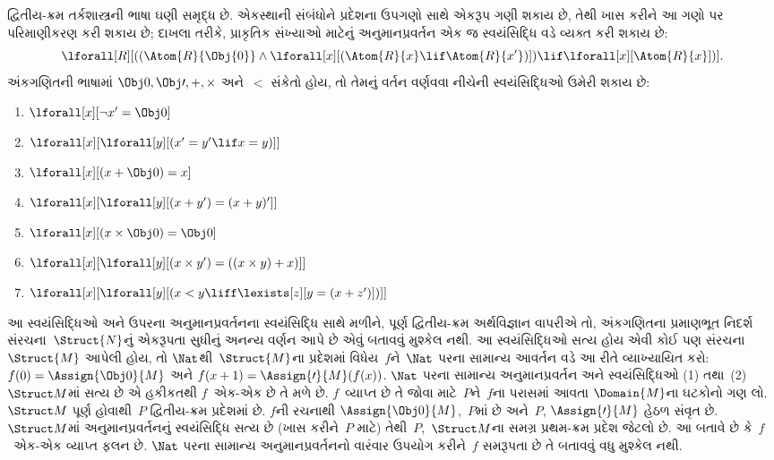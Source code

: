 દ્વિતીય-ક્રમ તર્કશાસ્ત્રની ભાષા ઘણી સમૃદ્ધ છે. એકસ્થાની સંબંધોને
પ્રદેશના ઉપગણો સાથે એકરૂપ ગણી શકાય છે, તેથી ખાસ કરીને આ ગણો પર
પરિમાણીકરણ કરી શકાય છે; દાખલા તરીકે, પ્રાકૃતિક સંખ્યાઓ માટેનું
અનુમાનપ્રવર્તન એક જ સ્વયંસિદ્ધિ વડે વ્યક્ત કરી શકાય છે:
\[
\lforall[R][((\Atom{R}{\Obj{0}} \land \lforall[x][(\Atom{R}{x} \lif
    \Atom{R}{x'})]) \lif \lforall[x][\Atom{R}{x}])].
\]
અંકગણિતની ભાષામાં $\Obj 0, \Obj \prime, +, \times$ અને~$<$ સંકેતો
હોય, તો તેમનું વર્તન વર્ણવવા નીચેની સ્વયંસિદ્ધિઓ ઉમેરી શકાય છે:
\begin{enumerate}
\item $\lforall[x][\lnot x' = \Obj 0]$
\item $\lforall[x][\lforall[y][(x' = y' \lif x = y)]]$
\item $\lforall[x][(x + \Obj 0) = x]$
\item $\lforall[x][\lforall[y][(x + y') = (x + y)']]$
\item $\lforall[x][(x \times \Obj 0) = \Obj 0]$
\item $\lforall[x][\lforall[y][(x \times y') = ((x \times y) + x)]]$
\item $\lforall[x][\lforall[y][(x < y \liff \lexists[z][y = (x + z')])]]$
\end{enumerate}
આ સ્વયંસિદ્ધિઓ અને ઉપરના અનુમાનપ્રવર્તનના સ્વયંસિદ્ધિ સાથે મળીને, પૂર્ણ
દ્વિતીય-ક્રમ અર્થવિજ્ઞાન વાપરીએ તો, અંકગણિતના પ્રમાણભૂત નિદર્શ
સંરચના~$\Struct{N}$નું એકરૂપતા સુધીનું અનન્ય વર્ણન આપે છે એવું
બતાવવું મુશ્કેલ નથી. આ સ્વયંસિદ્ધિઓ સત્ય હોય એવી કોઈ પણ
સંરચના~$\Struct{M}$ આપેલી હોય, તો $\Nat$થી~$\Struct{M}$ના
પ્રદેશમાં વિધેય~$f$ને~$\Nat$ પરના સામાન્ય આવર્તન વડે આ રીતે
વ્યાખ્યાયિત કરો: $f(0) = \Assign{\Obj 0}{M}$ અને
$f(x+1) = \Assign{\prime}{M}(f(x))$. $\Nat$ પરના સામાન્ય
અનુમાનપ્રવર્તન અને સ્વયંસિદ્ધિઓ (1) તથા~(2)~$\Struct M$માં સત્ય છે એ
હકીકતથી $f$~એક-એક છે તે મળે છે. $f$~વ્યાપ્ત છે તે
જોવા માટે~$P$ને~$f$ના પરાસમાં આવતા $\Domain{M}$ના ઘટકોનો ગણ
લો. $\Struct M$ પૂર્ણ હોવાથી~$P$ દ્વિતીય-ક્રમ પ્રદેશમાં છે.
$f$ની રચનાથી $\Assign{\Obj 0}{M}$,~$P$માં છે અને~$P$,
$\Assign{\prime}{M}$ હેઠળ સંવૃત છે. $\Struct M$માં અનુમાનપ્રવર્તનનું
સ્વયંસિદ્ધિ સત્ય છે (ખાસ કરીને~$P$ માટે) તેથી~$P$,~$\Struct M$ના
સમગ્ર પ્રથમ-ક્રમ પ્રદેશ જેટલો છે. આ બતાવે છે કે~$f$~એક-એક વ્યાપ્ત ફલન
છે. $\Nat$ પરના સામાન્ય અનુમાનપ્રવર્તનનો વારંવાર ઉપયોગ કરીને~$f$
સમરૂપતા છે તે બતાવવું વધુ મુશ્કેલ નથી.

